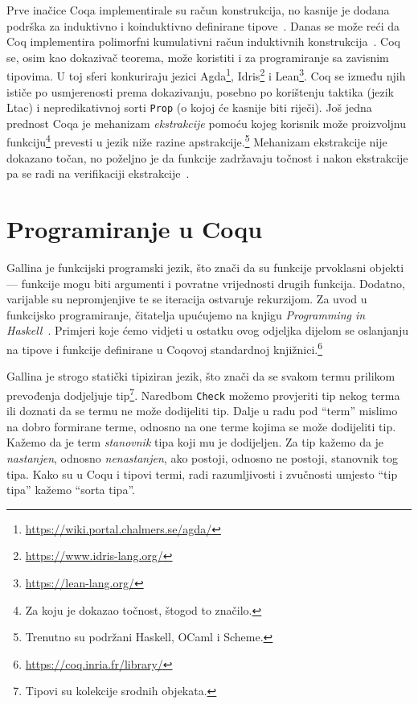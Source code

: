 Prve inačice Coqa implementirale su račun konstrukcija, no kasnije je dodana podrška za induktivno i koinduktivno definirane tipove~\cite{cic, coinductive}.
Danas se može reći da Coq implementira polimorfni kumulativni račun induktivnih konstrukcija~\cite{coqcoqcorrect}.
Coq se, osim kao dokazivač teorema, može koristiti i za programiranje sa zavisnim tipovima.
U toj sferi konkuriraju jezici Agda\footnote{\url{https://wiki.portal.chalmers.se/agda/}}, Idris\footnote{\url{https://www.idris-lang.org/}} i Lean\footnote{\url{https://lean-lang.org/}}. Coq se između njih ističe po usmjerenosti prema dokazivanju, posebno po korištenju taktika (jezik Ltac) i nepredikativnoj sorti \texttt{Prop} (o kojoj će kasnije biti riječi).
Još jedna prednost Coqa je mehanizam \textit{ekstrakcije} pomoću kojeg korisnik može proizvoljnu funkciju\footnote{Za koju je dokazao točnost, štogod to značilo.} prevesti u jezik niže razine apstrakcije.\footnote{Trenutno su podržani Haskell, OCaml i Scheme.}
Mehanizam ekstrakcije nije dokazano točan, no poželjno je da funkcije zadržavaju točnost i nakon ekstrakcije pa se radi na verifikaciji ekstrakcije~\cite{coqcoqcorrect}.

\section{Programiranje u Coqu}\label{sec:programiranje-u-gallini}
Gallina je funkcijski programski jezik, što znači da su funkcije prvoklasni objekti ---
funkcije mogu biti argumenti i povratne vrijednosti drugih funkcija.
Dodatno, varijable su nepromjenjive  te se iteracija ostvaruje rekurzijom.
Za uvod u funkcijsko programiranje, čitatelja upućujemo na knjigu \textit{Programming in Haskell}~\cite{Hutton_2016}.
Primjeri koje ćemo vidjeti u ostatku ovog odjeljka dijelom se oslanjanju na tipove i funkcije definirane u Coqovoj standardnoj knjižnici.\footnote{\url{https://coq.inria.fr/library/}}

Gallina je strogo statički tipiziran jezik, što znači da se svakom termu prilikom prevođenja dodjeljuje tip\footnote{Tipovi su kolekcije srodnih objekata.}.
Naredbom \texttt{Check} možemo provjeriti tip nekog terma ili doznati da se termu ne može dodijeliti tip.
Dalje u radu pod ``term'' mislimo na dobro formirane terme, odnosno na one terme kojima se može dodijeliti tip.
Kažemo da je term \textit{stanovnik} tipa koji mu je dodijeljen.
Za tip kažemo da je \textit{nastanjen}, odnosno \textit{nenastanjen}, ako postoji, odnosno ne postoji, stanovnik tog tipa.
Kako su u Coqu i tipovi termi, radi razumljivosti i zvučnosti umjesto ``tip tipa'' kažemo ``sorta tipa''.

